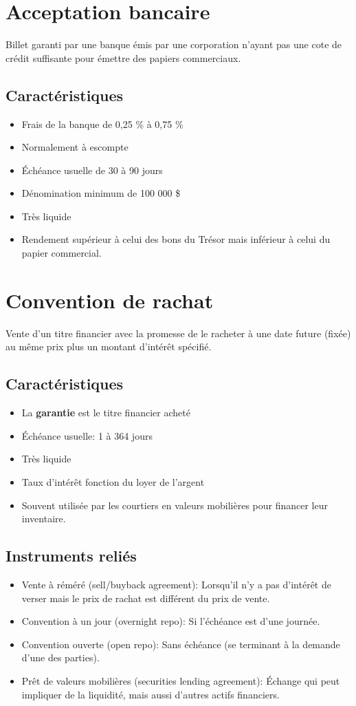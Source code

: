 \documentclass[letterpaper, 12pt]{article}
\newcommand{\1}{\mathds{1}}	%
\theoremstyle{definition}
\begin{document}
\section{Acceptation bancaire}
Billet garanti par une banque émis par une corporation n’ayant pas une cote de crédit suffisante pour émettre des papiers commerciaux.
\subsection{Caractéristiques}
\begin{itemize}
\item Frais de la banque de 0,25 \% à 0,75 \%
\item Normalement à escompte
\item Échéance usuelle de 30 à 90 jours
\item Dénomination minimum de 100 000 \$
\item Très liquide
\item Rendement supérieur à celui des bons du Trésor mais inférieur à celui du papier commercial.
\end{itemize}
\newpage
\section{Convention de rachat}
Vente d’un titre financier avec la promesse de le racheter à une date future (fixée) au même prix plus un montant d’intérêt spécifié.
\subsection{Caractéristiques}
\begin{itemize}
\item La \textbf{garantie} est le titre financier acheté
\item Échéance usuelle: 1 à 364 jours
\item Très liquide
\item Taux d’intérêt fonction du loyer de l’argent
\item Souvent utilisée par les courtiers en valeurs mobilières pour financer leur inventaire.
\end{itemize}
\subsection{Instruments reliés}
\begin{itemize}
\item Vente à réméré (sell/buyback agreement): Lorsqu’il n’y a pas d’intérêt de verser mais le prix de rachat est différent du prix de vente.
\item Convention à un jour (overnight repo): Si l’échéance est d’une journée.
\item Convention ouverte (open repo): Sans échéance (se terminant à la demande d’une des parties).
\item Prêt de valeurs mobilières (securities lending agreement): Échange qui peut impliquer de la liquidité, mais aussi d’autres actifs financiers.
\end{itemize}
\newpage
\end{document}

